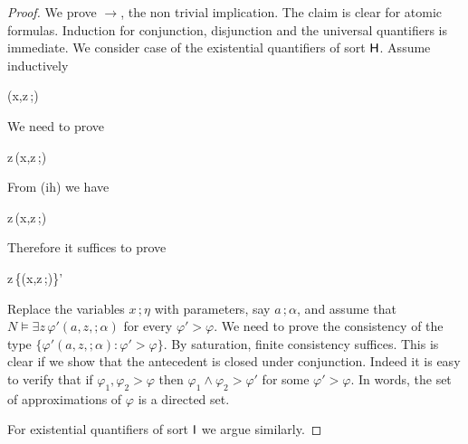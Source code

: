 \documentclass[10pt,oneside]{amsproc}
\def\existsH{\exists}
\begin{document}
\begin{proof}
  We prove $\rightarrow$, the non trivial implication.
  The claim is clear for atomic formulas.
  Induction for conjunction, disjunction and the universal quantifiers is immediate.
%
%
%
%
%
  We consider case of the existential quantifiers of sort ${\sf H}$.
  Assume inductively
  
  {\rightarrow}
  {\varphi(x,z\,;\eta)}

  We need to prove

  \ceq{\hfill\{\existsH z\,\varphi(x,z\,;\eta)\}'}
  {\rightarrow}
  {\existsH z\,\varphi(x,z\,;\eta)}

  From (ih) we have

  \ceq{\hfill\existsH z\,\{\varphi(x,z\,;\eta)\}'}
  {\rightarrow}
  {\existsH z\,\varphi(x,z\,;\eta)}

  Therefore it suffices to prove

  \ceq{\hfill\{\existsH z\,\varphi(x,z\,;\eta)\}'}
  {\rightarrow}
  {\existsH z\,\{\varphi(x,z\,;\eta)\}'}

Replace the variables $x\,;\eta$ with parameters, say $a\,;\alpha$, and assume that $N\models\existsH z\,\varphi'(a,z,;\alpha)$ for every $\varphi'>\varphi$.
We need to prove the consistency of the type $\{\varphi'(a,z,;\alpha):\varphi'>\varphi\}$.
By saturation, finite consistency suffices.
This is clear if we show that the antecedent is closed under conjunction.
Indeed it is easy to verify that if $\varphi_1,\varphi_2>\varphi$ then $\varphi_1\wedge\varphi_2>\varphi'$ for some $\varphi'>\varphi$.
In words, the set of approximations of $\varphi$ is a directed set.

For existential quantifiers of sort ${\sf I}$ we argue similarly.%
%
%
%
%
%
\end{proof}
\end{document}
